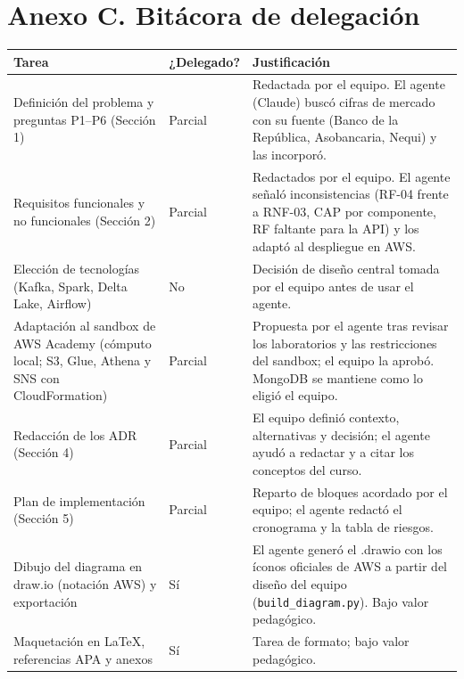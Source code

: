 \documentclass[12pt,letterpaper]{article}
\begin{document}
\section*{Anexo C. Bitácora de delegación}
\begin{footnotesize}
\begin{tabular}{@{}P{2.2in}P{0.85in}P{3.25in}@{}}
\toprule
\textbf{Tarea} & \textbf{¿Delegado?} & \textbf{Justificación}\\
\midrule
Definición del problema y preguntas P1--P6 (Sección 1) & Parcial & Redactada por el equipo. El agente (Claude) buscó cifras de mercado con su fuente (Banco de la República, Asobancaria, Nequi) y las incorporó.\\[1pt]
Requisitos funcionales y no funcionales (Sección 2) & Parcial & Redactados por el equipo. El agente señaló inconsistencias (RF-04 frente a RNF-03, CAP por componente, RF faltante para la API) y los adaptó al despliegue en AWS.\\[1pt]
Elección de tecnologías (Kafka, Spark, Delta Lake, Airflow) & No & Decisión de diseño central tomada por el equipo antes de usar el agente.\\[1pt]
Adaptación al sandbox de AWS Academy (cómputo local; S3, Glue, Athena y SNS con CloudFormation) & Parcial & Propuesta por el agente tras revisar los laboratorios y las restricciones del sandbox; el equipo la aprobó. MongoDB se mantiene como lo eligió el equipo.\\[1pt]
Redacción de los ADR (Sección 4) & Parcial & El equipo definió contexto, alternativas y decisión; el agente ayudó a redactar y a citar los conceptos del curso.\\[1pt]
Plan de implementación (Sección 5) & Parcial & Reparto de bloques acordado por el equipo; el agente redactó el cronograma y la tabla de riesgos.\\[1pt]
Dibujo del diagrama en draw.io (notación AWS) y exportación & Sí & El agente generó el .drawio con los íconos oficiales de AWS a partir del diseño del equipo (\texttt{build\_diagram.py}). Bajo valor pedagógico.\\[1pt]
Maquetación en LaTeX, referencias APA y anexos & Sí & Tarea de formato; bajo valor pedagógico.\\[1pt]
\bottomrule
\end{tabular}
\end{footnotesize}
\end{document}
